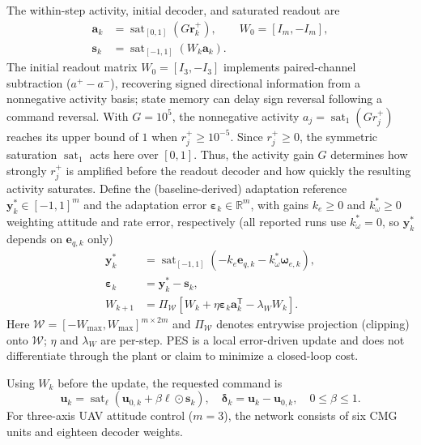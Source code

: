 \documentclass[letterpaper, 10 pt, conference]{ieeeconf}
\newcommand{\R}{\mathbb R}
\newcommand{\T}{^{\mathsf T}}
\newcommand{\sat}{\operatorname{sat}}
\begin{document}
The within-step activity, initial decoder, and saturated readout are
\begin{equation}
 \begin{aligned}
 \bm a_k&=\sat_{[0,1]}(G\bm r_k^+),\qquad W_0=[I_m,-I_m],\\
 \bm s_k&=\sat_{[-1,1]}(W_k\bm a_k).
 \end{aligned}
 \label{eq:readout}
\end{equation}
The initial readout matrix $W_0=[I_3,-I_3]$ implements paired-channel
subtraction ($a^+-a^-$), recovering signed directional information from
a nonnegative activity basis; state memory can delay sign reversal
following a command reversal. With $G=10^5$, the nonnegative activity
$a_j=\sat_{1}(G r_j^+)$ reaches its upper bound of $1$
when $r_j^+\ge10^{-5}$. Since $r_j^+\ge0$, the symmetric
saturation $\sat_{1}$ acts here over $[0,1]$. Thus, the activity
gain $G$ determines how strongly $r_j^+$ is amplified before the
readout decoder and how quickly the resulting activity saturates. Define the (baseline-derived) adaptation reference $\bm y_k^*\in[-1,1]^m$ and the adaptation error $\bm\varepsilon_k\in\R^m$, with gains $k_e\ge0$ and $k_\omega^*\ge0$ weighting attitude and rate error, respectively (all reported runs use $k_\omega^*=0$, so $\bm y_k^*$ depends on $\bm e_{q,k}$ only)
\begin{align}
 \bm y_k^*&=\sat_{[-1,1]}(-k_e\bm e_{q,k}-k_\omega^*\bm\omega_{e,k}),\\
 \bm\varepsilon_k&=\bm y_k^*-\bm s_k,\\
 W_{k+1}&=\Pi_{\mathcal W}
       [W_k+\eta\bm\varepsilon_k\bm a_k\T-\lambda_W W_k].
 \label{eq:pes}
\end{align}
Here $\mathcal W=[-W_{\max},W_{\max}]^{m\times2m}$ and $\Pi_{\mathcal W}$ denotes entrywise projection (clipping) onto $\mathcal W$; $\eta$ and $\lambda_W$ are per-step. PES is a local error-driven update and does not differentiate through the plant or claim to minimize a closed-loop cost.

Using $W_k$ before the update, the requested command is
\begin{equation}
 \bm u_k=\sat_{\bm\ell}(\bm u_{0,k}+\beta\bm\ell\odot\bm s_k),\quad
 \bm\delta_k=\bm u_k-\bm u_{0,k},\quad 0\le\beta\le1.
 \label{eq:residual}
\end{equation}
For three-axis UAV attitude control ($m=3$), the network consists of
six CMG units and eighteen decoder weights.
\end{document}
